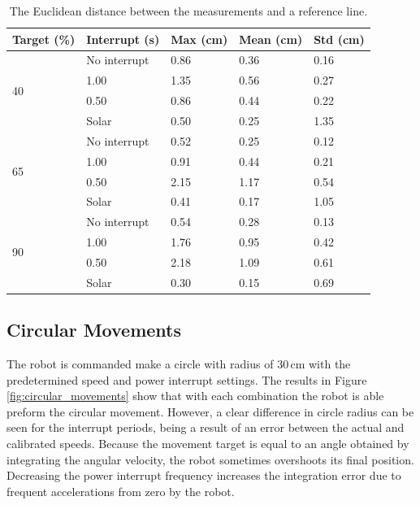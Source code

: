 \begin{table}[t]
	\centering
	\caption{The Euclidean distance between the measurements and a reference line.}
	\label{tab:straight_results}
	\begin{tabular}{|l|l||l|l|l|}
		\hline
		Target (\%) & Interrupt (s) & Max (cm) & Mean (cm) & Std (cm)\\
		\hline \hline
		\multirow{4}{*}{40} & No interrupt & 0.86 & 0.36 & 0.16 \\
		& 1.00 & 1.35 & 0.56 & 0.27 \\
		& 0.50 & 0.86 & 0.44 & 0.22 \\
		& Solar & 0.50 & 0.25 & 1.35 \\
		\hline
		\multirow{4}{*}{65} & No interrupt & 0.52 & 0.25 & 0.12 \\
		& 1.00 & 0.91 & 0.44 & 0.21 \\
		& 0.50 & 2.15 & 1.17 & 0.54 \\
		& Solar & 0.41 & 0.17 & 1.05 \\
		\hline
		\multirow{4}{*}{90} & No interrupt & 0.54 & 0.28 & 0.13 \\
		& 1.00 & 1.76 & 0.95 & 0.42 \\
		& 0.50 & 2.18 & 1.09 & 0.61 \\
		& Solar & 0.30 & 0.15 & 0.69 \\
		\hline
	\end{tabular}
\end{table}

\subsection{Circular Movements}

The robot is commanded make a circle with radius of 30\,cm with the predetermined speed and power interrupt settings.
The results in Figure \ref{fig:circular_movements} show that with each combination the robot is able preform the circular movement.
However, a clear difference in circle radius can be seen for the interrupt periods, being a result of an error between the actual and calibrated speeds.
Because the movement target is equal to an angle obtained by integrating the angular velocity, the robot sometimes overshoots its final position.
Decreasing the power interrupt frequency increases the integration error due to frequent accelerations from zero by the robot.

